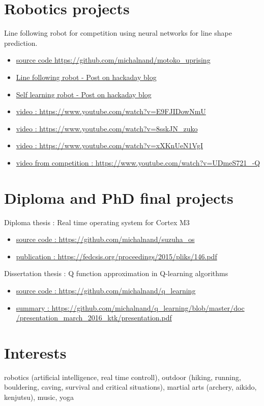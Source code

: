 \documentclass[10pt]{article}
\begin{document}
\section*{Robotics projects}
Line following robot for competition using neural networks for line shape prediction.
\begin{itemize}
\item \href{https://github.com/michalnand/motoko\_uprising}{source code https://github.com/michalnand/motoko\_uprising}
\item \href{https://hackaday.io/project/163799-motoko-uprising-deep-neural-network-line-following}{Line following robot - Post on hackaday blog}
\item \href{https://hackaday.io/project/19924-self-learning-robot}{Self learning robot - Post on hackaday blog}
\item \href{https://www.youtube.com/watch?v=E9FJIDowNmU}{video : https://www.youtube.com/watch?v=E9FJIDowNmU}
\item \href{https://www.youtube.com/watch?v=8sskJN\_zuko}{video : https://www.youtube.com/watch?v=8sskJN\_zuko}
\item \href{https://www.youtube.com/watch?v=xXKnUeN1VgI}{video : https://www.youtube.com/watch?v=xXKnUeN1VgI}
\item \href{https://www.youtube.com/watch?v=UDmeS721\_-Q}{video from competition : https://www.youtube.com/watch?v=UDmeS721\_-Q}
\end{itemize}

\section*{Diploma and PhD final projects}
Diploma thesis : Real time operating system for Cortex M3
\begin{itemize}
\item \href{https://github.com/michalnand/suzuha\_os}{source code : https://github.com/michalnand/suzuha\_os}
\item \href{https://fedcsis.org/proceedings/2015/pliks/146.pdf}{publication : https://fedcsis.org/proceedings/2015/pliks/146.pdf}
\end{itemize}
Dissertation thesis : Q function approximation in Q-learning algorithms
\begin{itemize}
\item \href{https://github.com/michalnand/q\_learning}{source code : https://github.com/michalnand/q\_learning}
\item \href{https://github.com/michalnand/q\_learning/blob/master/doc/presentation\_march\_2016\_ktk/presentation.pdf}{summary : https://github.com/michalnand/q\_learning/blob/master/doc\\
                  /presentation\_march\_2016\_ktk/presentation.pdf}
\end{itemize}

\section*{Interests}
robotics (artificial intelligence, real time controll),
outdoor (hiking, running, bouldering, caving, survival and critical situations),
martial arts (archery, aikido, kenjutsu), music, yoga
\end{document}
